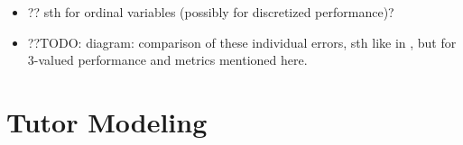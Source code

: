 \begin{itemize}
\begin{itemize}
\item ?? sth for ordinal variables (possibly for discretized performance)?
\item ??TODO: diagram: comparison of these individual errors, sth like in
  \cite[p.6]{pelanek-evaluation-student-models}, but for 3-valued performance and
  metrics mentioned here.
\end{itemize}
\end{itemize}

\section{Tutor Modeling}

